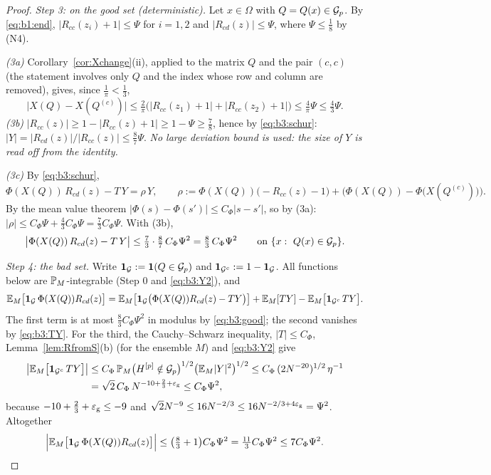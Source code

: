 \begin{proof}
\smallskip\noindent\emph{Step 3: on the good set (deterministic).} Let $x\in\Omega$ with $Q=Q(x)\in\cG_p$. By \eqref{eq:b1:end}, $|R_{cc}(z_i)+1|\le\Psi$ for $i=1,2$ and $|R_{cd}(z)|\le\Psi$, where $\Psi\le\frac18$ by \textup{(N4)}.

\emph{\textup{(3a)}} Corollary~\ref{cor:Xchange}(ii), applied to the matrix $Q$ and the pair $(c,c)$ (the statement involves only $Q$ and the index whose row and column are removed), gives, since $\frac1\pi<\frac13$,
\[
\big|X(Q)-X(Q^{(c)})\big|\le\tfrac2\pi\big(|R_{cc}(z_1)+1|+|R_{cc}(z_2)+1|\big)\le\tfrac4\pi\Psi\le\tfrac43\Psi .
\]
\emph{\textup{(3b)}} $|R_{cc}(z)|\ge1-|R_{cc}(z)+1|\ge1-\Psi\ge\frac78$, hence by \eqref{eq:b3:schur}: $|Y|=|R_{cd}(z)|/|R_{cc}(z)|\le\frac87\Psi$. \emph{No large deviation bound is used: the size of $Y$ is read off from the identity.}

\emph{\textup{(3c)}} By \eqref{eq:b3:schur},
\[
\Phi(X(Q))\,R_{cd}(z)-T\,Y=\rho\,Y,\qquad\rho:=\Phi(X(Q))\big(-R_{cc}(z)-1\big)+\Big(\Phi(X(Q))-\Phi\big(X(Q^{(c)})\big)\Big).
\]
By the mean value theorem $|\Phi(s)-\Phi(s')|\le C_\Phi|s-s'|$, so by (3a): $|\rho|\le C_\Phi\Psi+\frac43C_\Phi\Psi=\frac73C_\Phi\Psi$. With (3b),
\begin{equation}\label{eq:b3:good}
\big|\Phi(X(Q))\,R_{cd}(z)-T\,Y\big|\le\tfrac73\cdot\tfrac87\,C_\Phi\Psi^2=\tfrac83\,C_\Phi\Psi^2\qquad\text{on }\{x:\ Q(x)\in\cG_p\}.
\end{equation}

\smallskip\noindent\emph{Step 4: the bad set.} Write $\mathbf 1_{\cG}:=\mathbf 1(Q\in\cG_p)$ and $\mathbf 1_{\cG^c}:=1-\mathbf 1_{\cG}$. All functions below are $\P_M$-integrable (Step 0 and \eqref{eq:b3:Y2}), and
\[
\E_M\big[\mathbf 1_{\cG}\,\Phi(X(Q))R_{cd}(z)\big]=\E_M\big[\mathbf 1_{\cG}\big(\Phi(X(Q))R_{cd}(z)-TY\big)\big]+\E_M[TY]-\E_M\big[\mathbf 1_{\cG^c}\,TY\big].
\]
The first term is at most $\frac83C_\Phi\Psi^2$ in modulus by \eqref{eq:b3:good}; the second vanishes by \eqref{eq:b3:TY}. For the third, the Cauchy--Schwarz inequality, $|T|\le C_\Phi$, Lemma~\ref{lem:RfromS}(b) (for the ensemble $M$) and \eqref{eq:b3:Y2} give
\begin{align*}
\big|\E_M\big[\mathbf 1_{\cG^c}\,TY\big]\big|&\le C_\Phi\,\P_M\big(H^{[p]}\notin\cG_p\big)^{1/2}\big(\E_M|Y|^2\big)^{1/2}\le C_\Phi\,(2N^{-20})^{1/2}\,\eta^{-1}\\
&=\sqrt2\,C_\Phi\,N^{-10+\frac23+\eg}\le C_\Phi\Psi^2,
\end{align*}
because $-10+\frac23+\eg\le-9$ and $\sqrt2N^{-9}\le16N^{-2/3}\le16N^{-2/3+4\eg}=\Psi^2$. Altogether
\[
\Big|\E_M\big[\mathbf 1_{\cG}\,\Phi(X(Q))R_{cd}(z)\big]\Big|\le\big(\tfrac83+1\big)C_\Phi\Psi^2=\tfrac{11}3C_\Phi\Psi^2\le7C_\Phi\Psi^2.\qedhere
\]
\end{proof}

